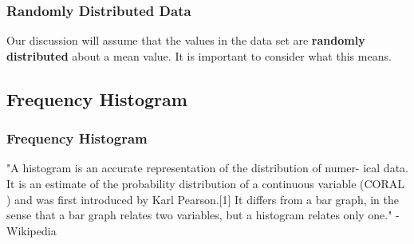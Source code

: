 \documentclass[fleqn]{ltx-talk} %
\newcommand{\sectionIsubsectionIItitle}{Randomly Distributed Data}
\newcommand{\sectionIsubsectionIIItitle}{Frequency Histogram}
\begin{document}
			\begin{frame}
				\frametitle{\sectionIsubsectionIItitle}

				Our discussion will assume that the values in the data set are {\bfseries \PR randomly distributed } about a mean value. It is important to consider what this means.
				
			\end{frame}

  	\subsection{\sectionIsubsectionIIItitle}\label{sectionIsubsectionIII}
			\begin{frame} 
				\frametitle{\sectionIsubsectionIIItitle}
				\bigskip

					"A {\GR histogram} is an accurate representation of the distribution of numer-
					ical data. It is an estimate of the probability distribution of a continuous
					variable (CORAL ) and was first introduced by Karl Pearson.[1] It differs
					from a bar graph, in the sense that a bar graph relates two variables, but a
					histogram relates only one." - Wikipedia

			
      \end{frame}	


  

     

    
\end{document}
